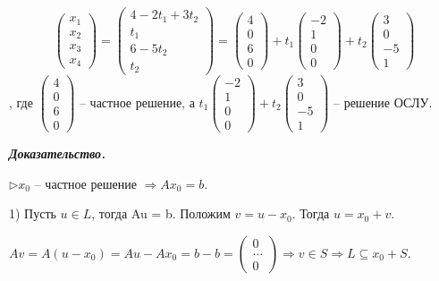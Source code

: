 \begin{equation*} \begin{pmatrix} x_1 \\ x_2 \\ x_3 \\ x_4 \end{pmatrix} = \begin{pmatrix} 4 - 2t_1 + 3t_2 \\ t_1 \\ 6 - 5t_2 \\ t_2 \end{pmatrix} = \begin{pmatrix} 4 \\ 0 \\ 6 \\ 0 \end{pmatrix} + t_1 \begin{pmatrix} -2 \\ 1 \\ 0 \\ 0 \end{pmatrix} + t_2 \begin{pmatrix} 3 \\ 0 \\ -5 \\ 1 \end{pmatrix} \end{equation*}, где $\begin{pmatrix} 4 \\ 0 \\ 6 \\ 0 \end{pmatrix}$ -- частное решение, а $ t_1 \begin{pmatrix} -2 \\ 1 \\ 0 \\ 0 \end{pmatrix} + t_2 \begin{pmatrix} 3 \\ 0 \\ -5 \\ 1 \end{pmatrix} $ -- решение ОСЛУ.

\bigskip
\textbf{\textit{Доказательство.}}

$\rhd x_0$ -- частное решение $\Rightarrow Ax_0 = b$.

1) Пусть $u \in L$, тогда Au = b. Положим $v = u - x_0$. Тогда $u = x_0 + v$.

$Av = A(u - x_0) = Au - Ax_0 = b - b = \begin{pmatrix} 0 \\ \dots \\ 0  \end{pmatrix} \Rightarrow v \in S \Rightarrow L \subseteq x_0 + S$.

